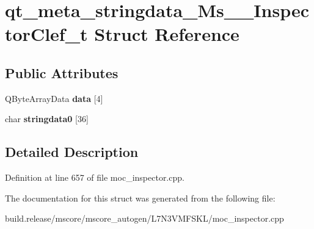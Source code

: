 \hypertarget{structqt__meta__stringdata___ms_____inspector_clef__t}{}\section{qt\+\_\+meta\+\_\+stringdata\+\_\+\+Ms\+\_\+\+\_\+\+Inspector\+Clef\+\_\+t Struct Reference}
\label{structqt__meta__stringdata___ms_____inspector_clef__t}
\subsection*{Public Attributes}
\begin{DoxyCompactItemize}
\item 
\mbox{\label{structqt__meta__stringdata___ms_____inspector_clef__t_a012b914c32475d52af678dbfb8781851}} 
Q\+Byte\+Array\+Data {\bfseries data} \mbox{[}4\mbox{]}
\item 
\mbox{\label{structqt__meta__stringdata___ms_____inspector_clef__t_a586889fc1afdecdef61056873587481e}} 
char {\bfseries stringdata0} \mbox{[}36\mbox{]}
\end{DoxyCompactItemize}


\subsection{Detailed Description}


Definition at line 657 of file moc\+\_\+inspector.\+cpp.



The documentation for this struct was generated from the following file\+:\begin{DoxyCompactItemize}
\item 
build.\+release/mscore/mscore\+\_\+autogen/\+L7\+N3\+V\+M\+F\+S\+K\+L/moc\+\_\+inspector.\+cpp\end{DoxyCompactItemize}
